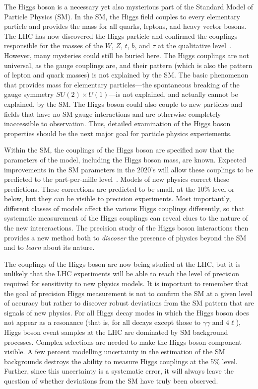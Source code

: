 \documentclass[%
 reprint,
 amsmath,amssymb,
 aps,
]{revtex4-1}
\begin{document}
The Higgs boson is a necessary yet also mysterious part of the
Standard Model of Particle Physics (SM).    In the SM, the Higgs field
couples to every elementary particle and provides the mass for all
quarks, leptons, and heavy vector bosons.   The LHC has now discovered
the Higgs particle and confirmed the couplings responsible for the
masses of the $W$, $Z$, $t$, $b$, and $\tau$ at the qualitative
level~\cite{LHCHiggssummary}.  However, many mysteries could still be
buried here.   The Higgs couplings are not universal, as the gauge
couplings are, and their pattern (which is also the pattern of lepton
and quark masses) is not explained by the SM.  The basic phenomenon that provides
mass for elementary particles---the spontaneous breaking of the gauge
symmetry $SU(2)\times U(1)$---is not explained, and actually cannot be
explained, by the SM.   The Higgs boson could also couple to new
particles and fields that have no SM gauge interactions and are
otherwise completely inaccessible to observation.  Thus, detailed
examination of the Higgs boson properties should be the next major
goal for particle physics experiements.

Within the SM, the couplings of the Higgs boson are specified now that
the parameters of the model, including the Higgs boson mass, are
known.  Expected improvements in the SM parameters in the 2020's will
allow these couplings to be predicted to the part-per-mille level~\cite{Lepage:2014fla}.
Models of new physics correct  these predictions.   These corrections
are predicted to be small, at the 10\% level or below, but they can
be visible to precision experiments.   Most importantly, different
classes of models affect the various Higgs couplings differently, so that
systematic measurement of the Higgs couplings can reveal clues to the
nature of the new intereractions.   The precision study of the Higgs
boson interactions then provides a new method both to {\it discover}  the
presence of physics beyond the SM and to {\it learn}  about its nature.

The couplings of the Higgs boson are now being studied at the LHC, but
it is unlikely that the LHC experiments will be able to reach the
level of precision required for sensitivity to new physics models. 
It is important to remember that the goal of
precision Higgs measurement is not to confirm the SM at a given level
of accuracy but rather to discover robust deviations from the SM
pattern that are signals of new physics.   For all Higgs decay modes in which the
Higgs boson does not appear as a resonance (that is, for all decays
except those to 
$\gamma\gamma$ and $4\ell$), Higgs boson event samples at the LHC are dominated
by SM background processes.  Complex selections are needed to make the
Higgs boson component visible. A few percent modelling uncertainty in
the estimation of the SM backgrounds
 destroys the ability to measure Higgs couplings at the 5\%
level.  Further, since this uncertainty is a systematic error, it will
always leave the question of whether deviations from the SM have truly
been observed.
\end{document}
